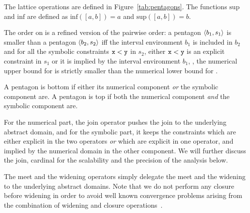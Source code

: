 \documentclass{elsart}
\begin{document}
The lattice operations are defined in Figure~\ref{tab:pentagons}.
The functions $\mathrm{sup}$ and $\mathrm{inf}$ are defined as  $\mathrm{inf}([a,b]) = a$ and $\mathrm{sup}([a,b]) = b$.

The order on \Pentagons{} is a refined version of the pairwise order: a pentagon $\langle b_1, s_1 \rangle$ is smaller than a pentagon $\langle b_2, s_2 \rangle$ iff the interval environment $b_1$ is included in $b_2$ and for all the symbolic constraints $\mathtt{x} < \mathtt{y}$ in $s_2$, either $\mathtt{x} < \mathtt{y}$ is an explicit constraint in $s_1$ or it is implied by the interval environment $b_1$, \ie, the numerical upper bound for  is strictly smaller than the numerical lower bound for .

A pentagon is bottom if either its numerical component \emph{or} the symbolic component are.
A pentagon is top if both the numerical component \emph{and} the symbolic component are.

For the numerical part, the join operator pushes the join to the underlying \Intervals{} abstract domain, and for the symbolic part, it keeps the constraints which are either explicit in the two operators \emph{or} which are explicit in one operator, and implied by the numerical domain in the other component. 
We will further discuss the join, cardinal for the scalability and the precision of the analysis below.

The meet and the widening operators simply delegate the meet and the widening to the underlying abstract domains.
Note that we do not perform any closure before widening in order to
avoid well known convergence problems arising from the combination of widening and closure operations~\cite{Mine01-2}.
\end{document}
